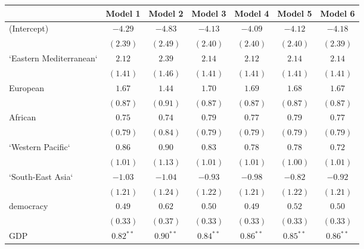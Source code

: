 
\begin{table}[!h]
\begin{center}
\begin{tabular}{l c c c c c c }
\toprule
 & Model 1 & Model 2 & Model 3 & Model 4 & Model 5 & Model 6 \\
\midrule
(Intercept)             & $-4.29$      & $-4.83$      & $-4.13$      & $-4.09$      & $-4.12$      & $-4.18$      \\
                        & $(2.39)$     & $(2.49)$     & $(2.40)$     & $(2.40)$     & $(2.40)$     & $(2.39)$     \\
`Eastern Mediterranean` & $2.12$       & $2.39$       & $2.14$       & $2.12$       & $2.14$       & $2.14$       \\
                        & $(1.41)$     & $(1.46)$     & $(1.41)$     & $(1.41)$     & $(1.41)$     & $(1.41)$     \\
European                & $1.67$       & $1.44$       & $1.70$       & $1.69$       & $1.68$       & $1.67$       \\
                        & $(0.87)$     & $(0.91)$     & $(0.87)$     & $(0.87)$     & $(0.87)$     & $(0.87)$     \\
African                 & $0.75$       & $0.74$       & $0.79$       & $0.77$       & $0.79$       & $0.77$       \\
                        & $(0.79)$     & $(0.84)$     & $(0.79)$     & $(0.79)$     & $(0.79)$     & $(0.79)$     \\
`Western Pacific`       & $0.86$       & $0.90$       & $0.83$       & $0.78$       & $0.78$       & $0.72$       \\
                        & $(1.01)$     & $(1.13)$     & $(1.01)$     & $(1.01)$     & $(1.00)$     & $(1.01)$     \\
`South-East Asia`       & $-1.03$      & $-1.04$      & $-0.93$      & $-0.98$      & $-0.82$      & $-0.92$      \\
                        & $(1.21)$     & $(1.24)$     & $(1.22)$     & $(1.21)$     & $(1.22)$     & $(1.21)$     \\
democracy               & $0.49$       & $0.62$       & $0.50$       & $0.49$       & $0.52$       & $0.50$       \\
                        & $(0.33)$     & $(0.37)$     & $(0.33)$     & $(0.33)$     & $(0.33)$     & $(0.33)$     \\
GDP                     & $0.82^{**}$  & $0.90^{**}$  & $0.84^{**}$  & $0.86^{**}$  & $0.85^{**}$  & $0.86^{**}$  \\

\end{tabular}
\end{center}
\end{table}
